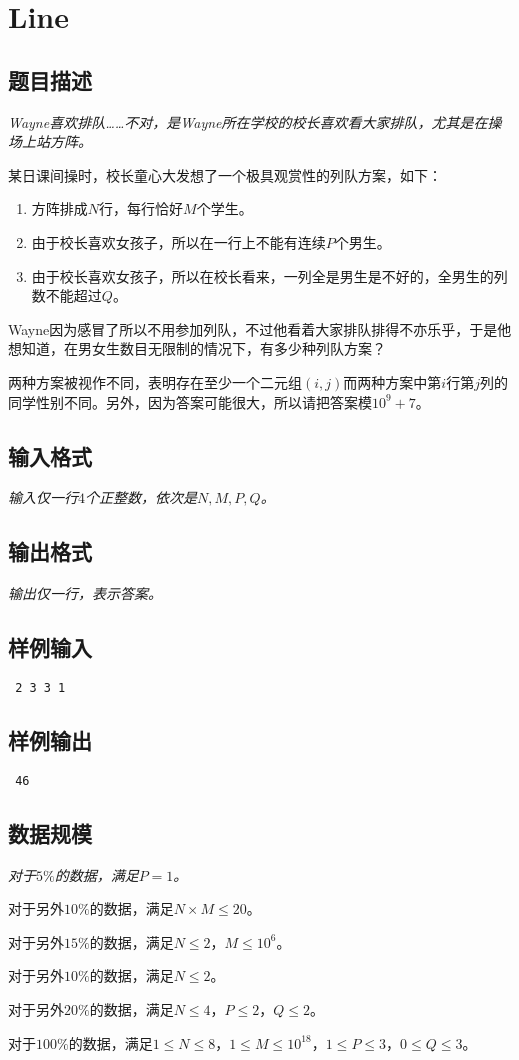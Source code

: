 \section{Line}
\subsection{题目描述}
{\itshape
Wayne喜欢排队……不对，是Wayne所在学校的校长喜欢看大家排队，尤其是在操场上站方阵。 \par
某日课间操时，校长童心大发想了一个极具观赏性的列队方案，如下： \par
\begin{enumerate}
\item 方阵排成$N$行，每行恰好$M$个学生。
\item 由于校长喜欢女孩子，所以在一行上不能有连续$P$个男生。
\item 由于校长喜欢女孩子，所以在校长看来，一列全是男生是不好的，全男生的列数不能超过$Q$。
\end{enumerate}
\par
Wayne因为感冒了所以不用参加列队，不过他看着大家排队排得不亦乐乎，于是他想知道，在男女生数目无限制的情况下，有多少种列队方案？ \par
两种方案被视作不同，表明存在至少一个二元组$(i,j)$而两种方案中第$i$行第$j$列的同学性别不同。另外，因为答案可能很大，所以请把答案模$10^9 + 7$。
}
\subsection{输入格式}
{\itshape
输入仅一行$4$个正整数，依次是$N,M,P,Q$。
}
\subsection{输出格式}
{\itshape
输出仅一行，表示答案。
}
\subsection{样例输入}
{\tt
2 3 3 1
}
\subsection{样例输出}
{\tt
46
}
\subsection{数据规模}
{\itshape
对于$5\%$的数据，满足$P = 1$。 \par
对于另外$10\%$的数据，满足$N \times M \le 20$。 \par
对于另外$15\%$的数据，满足$N \le 2$，$M \le 10^6$。 \par
对于另外$10\%$的数据，满足$N \le 2$。 \par
对于另外$20\%$的数据，满足$N \le 4$，$P \le 2$，$Q \le 2$。 \par
对于$100\%$的数据，满足$1 \le N \le 8$，$1 \le M \le 10^{18}$，$1 \le P \le 3$，$0 \le Q \le 3$。
}
